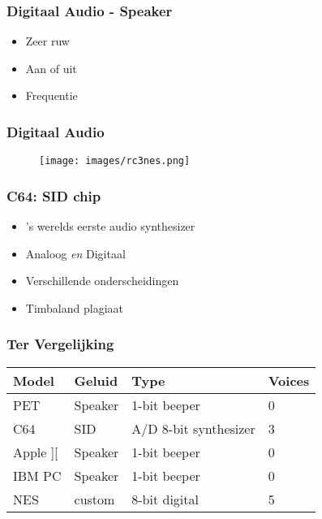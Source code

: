\documentclass[aspectratio=43]{uva-inf-presentation}
\begin{document}

\begin{frame}
\frametitle{Digitaal Audio - Speaker}

\begin{itemize}
\item Zeer ruw
\item Aan of uit
\item Frequentie
\end{itemize}

\end{frame}


\begin{frame}
\frametitle{Digitaal Audio}

\begin{figure}
\texttt{[image: images/rc3nes.png]}
\end{figure}

\end{frame}


\begin{frame}
\frametitle{C64: SID chip}

\begin{itemize}
\item 's werelds eerste audio synthesizer
\item Analoog \emph{en} Digitaal
\item Verschillende onderscheidingen
\item Timbaland plagiaat
\end{itemize}

\end{frame}


\begin{frame}
\frametitle{Ter Vergelijking}

\begin{tabular}{|l|l|l|l|}
\hline Model & Geluid & Type & Voices \\ \hline
PET & Speaker & 1-bit beeper & 0 \\
C64 & SID & A/D 8-bit synthesizer & 3 \\ \hline
Apple ][ & Speaker & 1-bit beeper & 0 \\
IBM PC & Speaker & 1-bit beeper & 0 \\
NES & custom & 8-bit digital & 5 \\ \hline
\end{tabular}

\end{frame}
\end{document}
